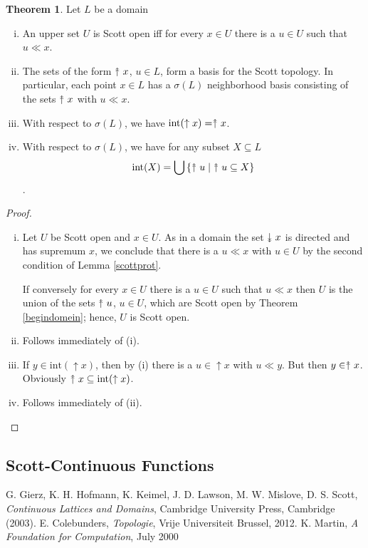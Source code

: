 \documentclass[a4paper,12pt]{article}
\newcommand{\upuparrow}{\mathrel{\reflectbox{\rotatebox[origin=c]{90}{$\twoheadrightarrow$}}}}
\newcommand{\downdownarrow}{\mathrel{\reflectbox{\rotatebox[origin=c]{90}{$\twoheadleftarrow$}}}}
\theoremstyle{definition}
\newtheorem{theorem}{Theorem}[section]
\renewcommand{\int}{\text{int}}
\begin{document}
\begin{theorem}
Let $L$ be a domain
    \begin{enumerate}[(i)]
        \item An upper set $U$ is Scott open iff for every $x \in U$ there is a $u \in U$ such that $u \ll x$.
        \item The sets of the form $\upuparrow x$, $u \in L$, form a basis for the Scott topology. In particular, each point $x \in L$ has a $\sigma(L)$ neighborhood basis consisting of the sets $\upuparrow x$ with $u \ll x$.
        \item With respect to $\sigma(L)$, we have $\int(\uparrow x) = \upuparrow x$.
        \item With respect to $\sigma(L)$, we have for any subset $X \subseteq L$
        $$\int(X) = \displaystyle\bigcup{\{\upuparrow u \; | \upuparrow u \subseteq X\}}$$.
    \end{enumerate}
\end{theorem}
\begin{proof}
\begin{enumerate}[(i)]
        \item Let $U$ be Scott open and $x \in U$. As in a domain the set $\downdownarrow x$ is directed and has supremum $x$, we conclude that there is a $u \ll x$ with $u \in U$ by the second condition of Lemma \ref{scottprot}.
            
            If conversely for every $x \in U$ there is a $u \in U$ such that $u \ll x$ then $U$ is the union of the sets $\upuparrow u$, $u \in U$, which are Scott open by Theorem \ref{begindomein}; hence, $U$ is Scott open.
        \item Follows immediately of (i).
        \item If $y \in \int(\uparrow x)$, then by (i) there is a $u \in \uparrow x$ with $u \ll y$. But then $y \in \upuparrow x$. Obviously $\upuparrow x \subseteq \int(\uparrow x)$.
        \item Follows immediately of (ii).
    \end{enumerate}
\end{proof}

\subsection{Scott-Continuous Functions}


\newpage
\begin{thebibliography}{99}
 G. Gierz, K. H. Hofmann, K. Keimel, J. D. Lawson, M. W. Mislove, D. S. Scott, {\em Continuous Lattices and Domains}, Cambridge University Press, Cambridge (2003).
 E. Colebunders, \emph{Topologie}, Vrije Universiteit Brussel, 2012.
 K. Martin, \emph{A Foundation for Computation}, July 2000
    \end{thebibliography}
\end{document}
